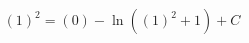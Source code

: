 \documentclass[preview]{standalone}
\begin{document}
\begin{align*}
{ \left(1\right) }^{2} = \left( 0 \right) - \ln \left( { \left(1\right) }^{2} + 1 \right) + C
\end{align*}
\end{document}
